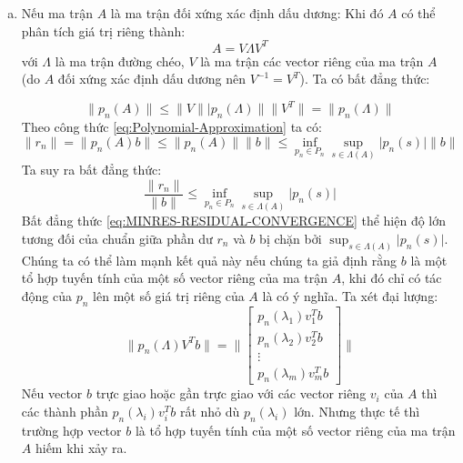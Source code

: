 \documentclass[14pt, a4paper]{article}
\numberwithin{equation}{section}
\numberwithin{algorithm}{section}
\numberwithin{figure}{section}
\numberwithin{dl}{section}
\numberwithin{md}{section}
\numberwithin{bd}{section}
\numberwithin{dn}{section}
\numberwithin{hq}{section}
\begin{document}
\begin{enumerate}[a)] %
    \item Nếu ma trận $A$ là ma trận đối xứng xác định dấu dương:
    Khi đó $A$ có thể phân tích giá trị riêng thành:
    \begin{equation}
        A = V \Lambda V^T
    \end{equation}
    với $\Lambda$ là ma trận đường chéo, $V$ là ma trận các vector riêng của ma trận $A$ (do $A$ đối xứng xác định dấu dương nên $V^{-1}=V^T$). Ta có bất đẳng thức:

    \begin{equation}
        \lVert p_n(A) \rVert \leq \lVert V \rVert \lvert p_n(\Lambda) \rVert \lVert V^T \rVert = \lVert p_n(\Lambda) \rVert
    \end{equation}
    Theo công thức \ref{eq:Polynomial-Approximation} ta có:
    \begin{equation}
        \lVert r_n \rVert = \lVert p_n(A)b \rVert \leq \lVert p_n(A) \rVert \lVert b \rVert \leq \inf_{p_n \in P_n} \sup_{s \in \Lambda(A)} \lvert p_n(s) \rvert \lVert b \rVert
    \end{equation}
    Ta suy ra bất đẳng thức:
    \begin{equation} \label{eq:MINRES-RESIDUAL-CONVERGENCE}
        \dfrac{\lVert r_n \rVert}{\lVert b \rVert} \leq \inf_{p_n \in P_n} \sup_{s \in \Lambda(A)} \lvert p_n(s) \rvert
    \end{equation}
    Bất đẳng thức \ref{eq:MINRES-RESIDUAL-CONVERGENCE} thể hiện độ lớn tương đối của chuẩn giữa phần dư $r_n$ và $b$ bị chặn bởi $\sup_{s \in \Lambda(A)} \lvert p_n(s) \rvert$. Chúng ta có thể làm mạnh kết quả này nếu chúng ta giả định rằng $b$ là một tổ hợp tuyến tính của một số vector riêng của ma trận $A$, khi đó chỉ có tác động của $p_n$ lên một số giá trị riêng của $A$ là có ý nghĩa.
    Ta xét đại lượng:
    \begin{equation}
        \lVert p_n(\Lambda) V^T b \rVert = \Biggl\lVert \begin{bmatrix} p_n(\lambda_1) v_1^T b \\ p_n(\lambda_2) v_2^T b \\ \vdots \\ p_n(\lambda_m) v_m^T b\end{bmatrix} \Biggl\rVert
    \end{equation}
    Nếu vector $b$ trực giao hoặc gần trực giao với các vector riêng $v_i$ của $A$ thì các thành phần $p_n(\lambda_i)v_i^T b$ rất nhỏ dù $p_n(\lambda_i)$ lớn. Nhưng thực tế thì trường hợp vector $b$ là tổ hợp tuyến tính của một số vector riêng của ma trận $A$ hiếm khi xảy ra.

\end{enumerate}
\end{document}
